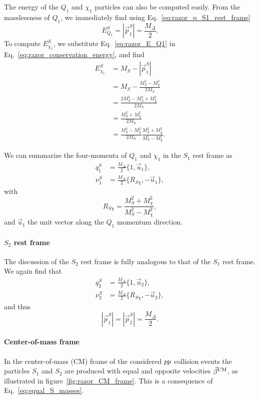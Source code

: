 The energy of the $Q_1$ and $\chi_1$ particles can also be computed easily. 
From the masslessness of $Q_1$, we immediately find using Eq.~\ref{eq:razor_p_S1_rest_frame}
\begin{equation}
  E^S_{Q_1} = |\vec{p}^S_1| = \frac{M_\Delta}{2}. \label{eq:razor_E_Q1}
\end{equation}
To compute $E^S_{\chi_1}$, we substitute Eq.~\ref{eq:razor_E_Q1} in 
Eq.~\ref{eq:razor_conservation_energy}, and find 
\begin{align}
  E^S_{\chi_1} &= M_S - |\vec{p}^S_1|\\
	       &= M_S - \frac{M_S^2 -M_{\chi}^2}{2 M_S} \\
	       &= \frac{2M_S^2 - M_S^2 + M_{\chi}^2}{2 M_S} \\
	       &= \frac{M_S^2 + M_{\chi}^2}{2 M_S} \\
	       &= \frac{M_S^2 - M_{\chi}^2}{2 M_S} \frac{M_S^2 + M_{\chi}^2}{M_S^2 - M_{\chi}^2} .
\end{align}

We can summarize the four-momenta of $Q_1$ and $\chi_1$ in the $S_1$ rest frame as
\begin{align}
  q_1^S   &= \frac{M_\Delta}{2} \{ 1, \vec{u}_1\} , \\  
  \nu_1^S &= \frac{M_\Delta}{2} \{ R_{S\chi}, -\vec{u}_1\} ,
\end{align}
with $$R_{S\chi} = \frac{M_S^2 + M_{\chi}^2}{M_S^2 - M_{\chi}^2},$$ and $\vec{u}_1$ the unit
vector along the $Q_1$ momentum direction.



\paragraph{$S_2$ rest frame}
The discussion of the $S_2$ rest frame is fully analogous to that of the $S_1$ rest frame. We
again find that
\begin{align}
  q_2^S   &= \frac{M_\Delta}{2} \{ 1, \vec{u}_2\} , \\  
  \nu_2^S &= \frac{M_\Delta}{2} \{ R_{S\chi}, -\vec{u}_2\} ,
\end{align}
and thus
\begin{equation}
  |\vec{p}^S_1| = |\vec{p}^S_2| = \frac{M_\Delta}{2} .
\end{equation}


\paragraph{Center-of-mass frame}
In the center-of-mass (CM) frame of the considered ${p}{p}$ collision events the particles $S_1$
and $S_2$ are produced with equal and opposite velocities $\vec{\beta}^{\textrm{CM}}$, as
illustrated in figure~\ref{fig:razor_CM_frame}. This is a consequence of
Eq.~\ref{eq:equal_S_masses}. 

